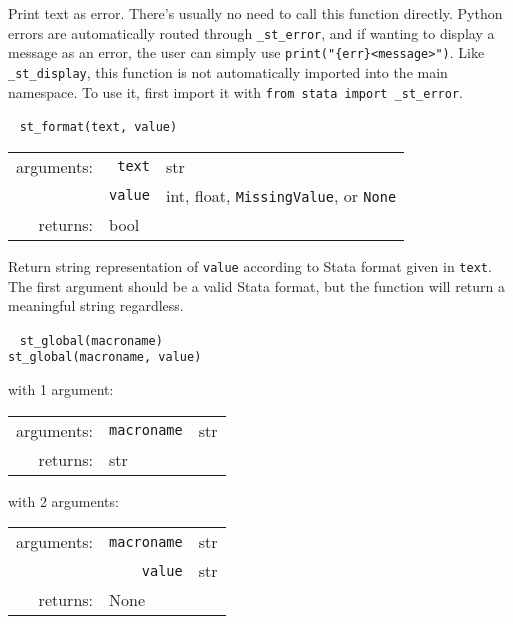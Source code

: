 \documentclass{article}
\begin{document}
			\vspace{1.5mm}
			\noindent Print text as error. There's usually no need to call this function directly. Python errors are automatically routed through \lstinline{_st_error}, and if wanting to display a message as an error, the user can simply use \lstinline$print("{err}<message>")$. Like \lstinline{_st_display}, this function is not automatically imported into the main namespace. To use it, first import it with \lstinline{from stata import _st_error}. \newline
			
			
			\ \newline
			\noindent \lstinline$st_format(text, value)$
								
			\vspace{1.5mm}
			\noindent 
			\indent \begin{tabular}{rrl}
					arguments: & \texttt{text} & str \\
					 & \texttt{value} & int, float, \lstinline$MissingValue$, or \lstinline$None$ \\
					returns: & \multicolumn{2}{l}{bool}
				\end{tabular}
								
			\vspace{1.5mm}
			\noindent Return string representation of \lstinline{value} according to Stata format given in \lstinline{text}. The first argument should be a valid Stata format, but the function will return a meaningful string regardless. \newline
			
			
			\ \newline
			\noindent \lstinline$st_global(macroname)$ \\
			\noindent \lstinline$st_global(macroname, value)$
								
			\vspace{1.5mm}
			\noindent 
			\indent with 1 argument:
			
			\indent \qquad \begin{tabular}{rrl}
					arguments: & \texttt{macroname} & str \\
					returns: & \multicolumn{2}{l}{str}
				\end{tabular}
								
			\vspace{1.5mm}
			\noindent
			\indent with 2 arguments:
			
			\indent \qquad \begin{tabular}{rrl}
					arguments: & \texttt{macroname} & str \\
					  & \texttt{value} & str \\
					returns: & \multicolumn{2}{l}{None}
				\end{tabular}
								
\end{document}
